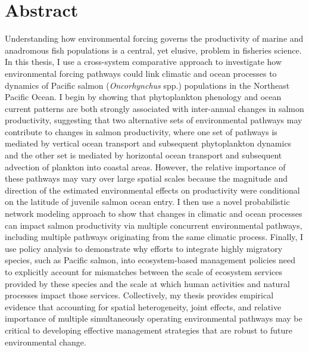 %
%
%


\chapter*{Abstract}


Understanding how environmental forcing governs the productivity of marine and
anadromous fish populations is a central, yet elusive, problem in fisheries
science. In this thesis, I use a cross-system comparative approach to
investigate how environmental forcing pathways could link climatic and ocean
processes to dynamics of Pacific salmon (\textit{Oncorhynchus} spp.) populations
in the Northeast Pacific Ocean. I begin by showing that phytoplankton phenology
and ocean current patterns are both strongly associated with inter-annual
changes in salmon productivity, suggesting that two alternative sets of
environmental pathways may contribute to changes in salmon productivity, where
one set of pathways is mediated by vertical ocean transport and subsequent
phytoplankton dynamics and the other set is mediated by horizontal ocean
transport and subsequent advection of plankton into coastal areas. However, the
relative importance of these pathways may vary over large spatial scales because
the magnitude and direction of the estimated environmental effects on
productivity were conditional on the latitude of juvenile salmon ocean entry. I
then use a novel probabilistic network modeling approach to show that changes in
climatic and ocean processes can impact salmon productivity via multiple
concurrent environmental pathways, including multiple pathways originating from
the same climatic process. Finally, I use policy analysis to demonstrate why
efforts to integrate highly migratory species, such as Pacific salmon, into
ecosystem-based management policies need to explicitly account for mismatches
between the scale of ecosystem services provided by these species and the scale
at which human activities and natural processes impact those services.
Collectively, my thesis provides empirical evidence that accounting for spatial
heterogeneity, joint effects, and relative importance of multiple simultaneously
operating environmental pathways may be critical to developing effective
management strategies that are robust to future environmental change.

